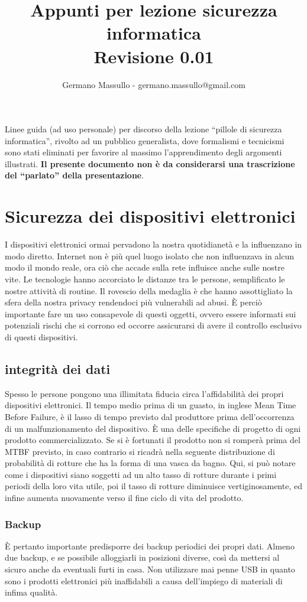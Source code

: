 \documentclass[italian,a4paper,12pt,oneside]{report}
\title{Appunti per lezione sicurezza informatica\\
Revisione 0.01}
\author{Germano Massullo - germano.massullo@gmail.com}
\date{}
\begin{document}
\maketitle

Linee guida (ad uso personale) per discorso della lezione ``pillole di sicurezza
informatica'', rivolto ad un pubblico generalista, dove formalismi e tecnicismi
sono stati eliminati per favorire al massimo l'apprendimento degli argomenti
illustrati.
\textbf{Il presente documento non è da considerarsi una trascrizione del ``parlato''
della presentazione}.



\chapter{Sicurezza dei dispositivi elettronici}
I dispositivi elettronici ormai pervadono la nostra quotidianetà e la influenzano
in modo diretto. Internet non è più quel luogo isolato che non influenzava in alcun
modo il mondo reale, ora ciò che accade sulla rete influisce anche sulle nostre vite.
Le tecnologie hanno accorciato le distanze tra le persone, semplificato
le nostre attività di routine. Il rovescio della medaglia è che hanno assottigliato
la sfera della nostra privacy rendendoci più vulnerabili ad abusi. È perciò
importante fare un uso consapevole di questi oggetti, ovvero essere informati
sui potenziali rischi che si corrono ed occorre assicurarsi di avere il controllo esclusivo
di questi dispositivi.

\section{integrità dei dati}
Spesso le persone pongono una illimitata fiducia circa l'affidabilità dei
propri dispositivi elettronici.
Il tempo medio prima di un guasto, in inglese Mean Time Before Failure, è il
lasso di tempo previsto dal produttore prima dell'occorrenza di un malfunzionamento del
dispositivo. È una delle specifiche di progetto di ogni prodotto commercializzato.
Se si è fortunati il prodotto non si romperà prima del MTBF previsto, in caso
contrario si ricadrà nella seguente distribuzione di probabilità di rotture che
ha la forma di una vasca da bagno. Qui, si può notare come i dispositivi
siano soggetti ad un alto tasso di rotture durante i primi periodi della loro
vita utile, poi il tasso di rotture diminuisce vertiginosamente, ed infine
aumenta nuovamente verso il fine ciclo di vita del prodotto.
\subsection{Backup}
È pertanto importante predisporre dei backup periodici dei propri dati.
Almeno due backup, e se possibile alloggiarli in posizioni diverse, così
da mettersi al sicuro anche da eventuali furti in casa.
Non utilizzare mai penne USB in quanto sono i prodotti elettronici più
inaffidabili a causa dell'impiego di materiali di infima qualità.
\end{document}
